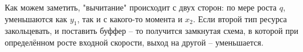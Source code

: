 \vspace{0.5in}

Как можем заметить, "вычитание" происходит с двух сторон: по мере роста $q$, уменьшаются как $y_1$, так и с какого-то момента и $x_2$. Если второй тип ресурса закольцевать, и поставить буффер -- то получится замкнутая схема, в которой при определённом росте входной скорости, выход на другой -- уменьшается.	




















































































































